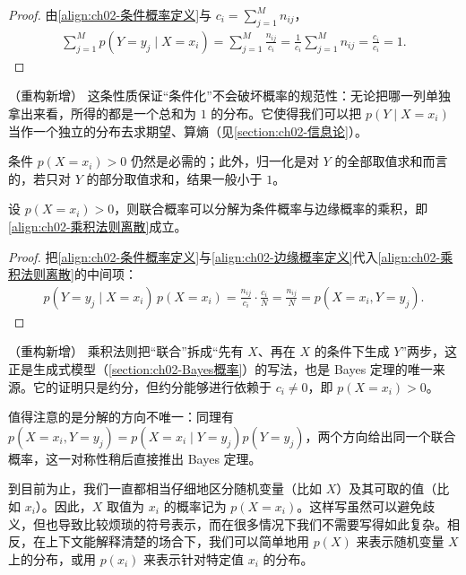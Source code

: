 \documentclass[../../main.tex]{subfiles}
\begin{document}
\begin{proof}
由\eqref{align:ch02-条件概率定义}与 $c_i=\sum_{j=1}^{M}n_{ij}$，
\begin{align*}
  \sum_{j=1}^{M} p(Y=y_j\mid X=x_i) = \sum_{j=1}^{M}\frac{n_{ij}}{c_i} = \frac{1}{c_i}\sum_{j=1}^{M}n_{ij} = \frac{c_i}{c_i} = 1 .
\end{align*}
\end{proof}

\begin{remark}（重构新增）
这条性质保证“条件化”不会破坏概率的规范性：无论把哪一列单独拿出来看，所得的都是一个总和为 $1$ 的分布。它使得我们可以把 $p(Y\mid X=x_i)$ 当作一个独立的分布去求期望、算熵（见\cref{section:ch02-信息论}）。

条件 $p(X=x_i)>0$ 仍然是必需的；此外，归一化是对 $Y$ 的全部取值求和而言的，若只对 $Y$ 的部分取值求和，结果一般小于 $1$。
\end{remark}

\begin{proposition}\label{proposition:ch02-乘积法则离散}
设 $p(X=x_i)>0$，则联合概率可以分解为条件概率与边缘概率的乘积，即\eqref{align:ch02-乘积法则离散}成立。
\end{proposition}

\begin{proof}
把\eqref{align:ch02-条件概率定义}与\eqref{align:ch02-边缘概率定义}代入\eqref{align:ch02-乘积法则离散}的中间项：
\begin{align*}
  p(Y=y_j\mid X=x_i)\,p(X=x_i) = \frac{n_{ij}}{c_i}\cdot\frac{c_i}{N} = \frac{n_{ij}}{N} = p(X=x_i,Y=y_j) .
\end{align*}
\end{proof}

\begin{remark}（重构新增）
乘积法则把“联合”拆成“先有 $X$、再在 $X$ 的条件下生成 $Y$”两步，这正是生成式模型（\cref{section:ch02-Bayes概率}）的写法，也是 Bayes 定理的唯一来源。它的证明只是约分，但约分能够进行依赖于 $c_i\neq0$，即 $p(X=x_i)>0$。

值得注意的是分解的方向不唯一：同理有 $p(X=x_i,Y=y_j)=p(X=x_i\mid Y=y_j)p(Y=y_j)$，两个方向给出同一个联合概率，这一对称性稍后直接推出 Bayes 定理。
\end{remark}

到目前为止，我们一直都相当仔细地区分随机变量（比如 $X$）及其可取的值（比如 $x_i$）。因此，$X$ 取值为 $x_i$ 的概率记为 $p(X=x_i)$。这样写虽然可以避免歧义，但也导致比较烦琐的符号表示，而在很多情况下我们不需要写得如此复杂。相反，在上下文能解释清楚的场合下，我们可以简单地用 $p(X)$ 来表示随机变量 $X$ 上的分布，或用 $p(x_i)$ 来表示针对特定值 $x_i$ 的分布。
\end{document}

